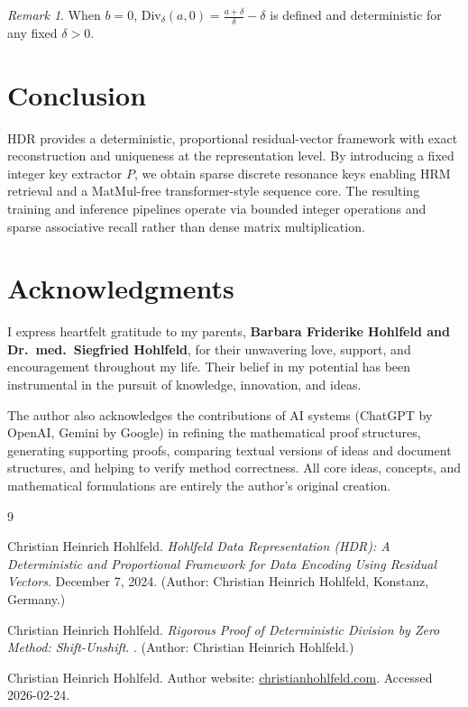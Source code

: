 \documentclass[11pt,a4paper]{article}
\theoremstyle{definition}
\theoremstyle{plain}
\theoremstyle{remark}
\newtheorem{remark}{Remark}[section]
\begin{document}
\begin{remark}
When $b=0$, $\mathrm{Div}_\delta(a,0)=\frac{a+\delta}{\delta}-\delta$ is defined and deterministic for any fixed $\delta>0$.
\end{remark}

\section{Conclusion}
HDR provides a deterministic, proportional residual-vector framework with exact reconstruction and uniqueness at the representation level.
By introducing a fixed integer key extractor $P$, we obtain sparse discrete resonance keys enabling HRM retrieval and a MatMul-free
transformer-style sequence core. The resulting training and inference pipelines operate via bounded integer operations and sparse associative recall
rather than dense matrix multiplication.

\section*{Acknowledgments}

I express heartfelt gratitude to my parents,
\textbf{Barbara Friderike Hohlfeld and Dr.\ med.\ Siegfried Hohlfeld},
for their unwavering love, support, and encouragement throughout my life.
Their belief in my potential has been instrumental in the pursuit of knowledge, innovation, and ideas.

The author also acknowledges the contributions of AI systems (ChatGPT by OpenAI,
Gemini by Google) in refining the mathematical proof structures, generating supporting proofs,
comparing textual versions of ideas and document structures,
and helping to verify method correctness.
All core ideas, concepts, and mathematical formulations are entirely the author's original creation.

\begin{thebibliography}{9}

Christian Heinrich Hohlfeld.
\newblock \emph{Hohlfeld Data Representation (HDR): A Deterministic and Proportional Framework for Data Encoding Using Residual Vectors}.
\newblock December 7, 2024. (Author: Christian Heinrich Hohlfeld, Konstanz, Germany.)

Christian Heinrich Hohlfeld.
\newblock \emph{Rigorous Proof of Deterministic Division by Zero Method: Shift-Unshift}.
. (Author: Christian Heinrich Hohlfeld.)

Christian Heinrich Hohlfeld.
\newblock Author website: \href{https://christianhohlfeld.com}{christianhohlfeld.com}. Accessed 2026-02-24.

\end{thebibliography}
\end{document}
